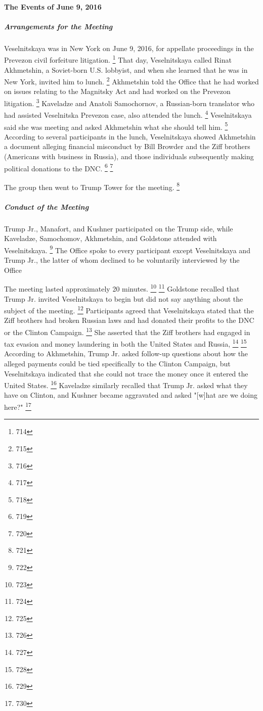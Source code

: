 \paragraph{The Events of June 9, 2016}

\subparagraph{Arrangements for the Meeting}

Veselnitskaya was in New York on June 9, 2016, for appellate proceedings in the Prevezon civil forfeiture litigation.%
\footnote{714}
That day, Veselnitskaya called Rinat Akhmetshin, a Soviet-born U.S. lobbyist,
and when she learned that he was in New York, invited him to lunch.%
\footnote{715}
Akhmetshin told the Office that he had worked on issues relating to the Magnitsky Act and had worked on the Prevezon litigation.%
\footnote{716}
Kaveladze and Anatoli Samochornov, a Russian-born translator who had assisted Veselnitska Prevezon case, also attended the lunch.%
\footnote{717}
 Veselnitskaya said she was meeting  and asked Akhmetshin what she should tell him.%
\footnote{718}
According to several participants in the lunch, Veselnitskaya showed Akhmetshin a document alleging financial misconduct by Bill Browder and the Ziff brothers (Americans with business in Russia), and those individuals subsequently making political donations to the DNC.%
\footnote{719}
\footnote{720}

The group then went to Trump Tower for the meeting.%
\footnote{721}

\subparagraph{Conduct of the Meeting}

Trump Jr., Manafort, and Kushner participated on the Trump side, while Kaveladze, Samochomov, Akhmetshin, and Goldstone attended with Veselnitskaya.%
\footnote{722}
The Office spoke to every participant except Veselnitskaya and Trump Jr., the latter of whom declined to be voluntarily interviewed by the Office

The meeting lasted approximately 20 minutes.%
\footnote{723}
\footnote{724}
 Goldstone recalled that Trump Jr. invited Veselnitskaya to begin but did not say anything about the subject of the meeting.%
\footnote{725}
Participants agreed that Veselnitskaya stated that the Ziff brothers had broken Russian laws and had donated their profits to the DNC or the Clinton Campaign.%
\footnote{726}
She asserted that the Ziff brothers had engaged in tax evasion and money laundering in both the United States and Russia,%
\footnote{727}
\footnote{728}
According to Akhmetshin, Trump Jr. asked follow-up questions about how the alleged payments could be tied specifically to the Clinton Campaign, but Veselnitskaya indicated that she could not trace the money once it entered the United States.%
\footnote{729}
Kaveladze similarly recalled that Trump Jr. asked what they have on Clinton, and Kushner became aggravated and asked "[w]hat are we doing here?"%
\footnote{730}


